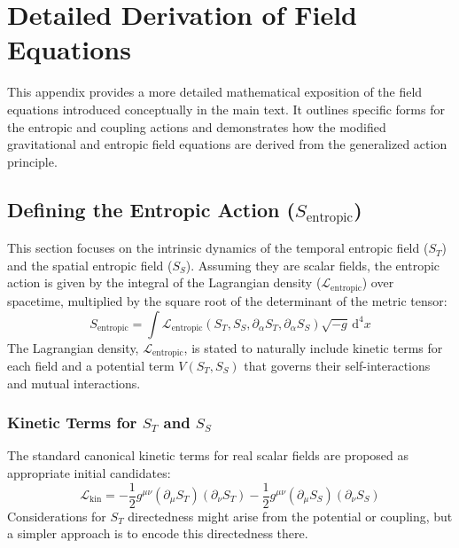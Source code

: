 \documentclass[11pt,a4paper]{article}
\newcommand{\ST}{S_T}
\newcommand{\SSp}{S_S}
\newcommand{\Sentropic}{S_{\text{entropic}}}
\begin{document}
\printbibliography

\newpage
\appendix
\section{Detailed Derivation of Field Equations}
\label{app:derivations}
This appendix provides a more detailed mathematical exposition of the field equations introduced conceptually in the main text. It outlines specific forms for the entropic and coupling actions and demonstrates how the modified gravitational and entropic field equations are derived from the generalized action principle.

\subsection{Defining the Entropic Action ($\Sentropic$)}
This section focuses on the intrinsic dynamics of the temporal entropic field ($\ST$) and the spatial entropic field ($\SSp$). Assuming they are scalar fields, the entropic action is given by the integral of the Lagrangian density ($\mathcal{L}_{\text{entropic}}$) over spacetime, multiplied by the square root of the determinant of the metric tensor:
\begin{equation*}
\Sentropic=\int\mathcal{L}_{\text{entropic}}(\ST,\SSp,\partial_\alpha\ST,\partial_\alpha\SSp)\sqrt{-g}\,\text{d}^4x
\end{equation*}
The Lagrangian density, $\mathcal{L}_{\text{entropic}}$, is stated to naturally include kinetic terms for each field and a potential term $V(\ST,\SSp)$ that governs their self-interactions and mutual interactions.

\subsubsection{Kinetic Terms for $\ST$ and $\SSp$}
The standard canonical kinetic terms for real scalar fields are proposed as appropriate initial candidates:
\begin{equation*}
\mathcal{L}_{\text{kin}}=-\frac{1}{2}g^{\mu\nu}(\partial_\mu\ST)(\partial_\nu\ST)-\frac{1}{2}g^{\mu\nu}(\partial_\mu\SSp)(\partial_\nu\SSp)
\end{equation*}
Considerations for $\ST$ directedness might arise from the potential or coupling, but a simpler approach is to encode this directedness there.
\end{document}
